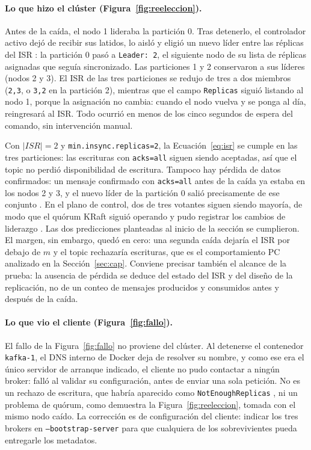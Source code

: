 \documentclass[11pt,a4paper]{article}
\begin{document}
\paragraph{Lo que hizo el clúster (Figura~\ref{fig:reeleccion}).}
Antes de la caída, el nodo 1 lideraba la partición 0. Tras detenerlo, el controlador activo dejó de recibir sus latidos, lo aisló y eligió un nuevo líder entre las réplicas del ISR \cite{kafkadocs,kip500}: la partición 0 pasó a \texttt{Leader: 2}, el siguiente nodo de su lista de réplicas asignadas que seguía sincronizado. Las particiones 1 y 2 conservaron a sus líderes (nodos 2 y 3). El ISR de las tres particiones se redujo de tres a dos miembros (\texttt{2,3}, o \texttt{3,2} en la partición 2), mientras que el campo \texttt{Replicas} siguió listando al nodo 1, porque la asignación no cambia: cuando el nodo vuelva y se ponga al día, reingresará al ISR. Todo ocurrió en menos de los cinco segundos de espera del comando, sin intervención manual.

Con $|ISR| = 2$ y \texttt{min.insync.replicas=2}, la Ecuación~\eqref{eq:isr} se cumple en las tres particiones: las escrituras con \texttt{acks=all} siguen siendo aceptadas, así que el topic no perdió disponibilidad de escritura. Tampoco hay pérdida de datos confirmados: un mensaje confirmado con \texttt{acks=all} antes de la caída ya estaba en los nodos 2 y 3, y el nuevo líder de la partición 0 salió precisamente de ese conjunto \cite{zhou2024distributed}. En el plano de control, dos de tres votantes siguen siendo mayoría, de modo que el quórum KRaft siguió operando y pudo registrar los cambios de liderazgo \cite{ongaro2014raft}. Las dos predicciones planteadas al inicio de la sección se cumplieron. El margen, sin embargo, quedó en cero: una segunda caída dejaría el ISR por debajo de $m$ y el topic rechazaría escrituras, que es el comportamiento PC analizado en la Sección~\ref{sec:cap}. Conviene precisar también el alcance de la prueba: la ausencia de pérdida se deduce del estado del ISR y del diseño de la replicación, no de un conteo de mensajes producidos y consumidos antes y después de la caída.

\paragraph{Lo que vio el cliente (Figura~\ref{fig:fallo}).}
El fallo de la Figura~\ref{fig:fallo} no proviene del clúster. Al detenerse el contenedor \texttt{kafka-1}, el DNS interno de Docker deja de resolver su nombre, y como ese era el único servidor de arranque indicado, el cliente no pudo contactar a ningún broker: falló al validar su configuración, antes de enviar una sola petición. No es un rechazo de escritura, que habría aparecido como \texttt{NotEnoughReplicas} \cite{kafkadocs}, ni un problema de quórum, como demuestra la Figura~\ref{fig:reeleccion}, tomada con el mismo nodo caído. La corrección es de configuración del cliente: indicar los tres brokers en \texttt{--bootstrap-server} para que cualquiera de los sobrevivientes pueda entregarle los metadatos.
\end{document}
